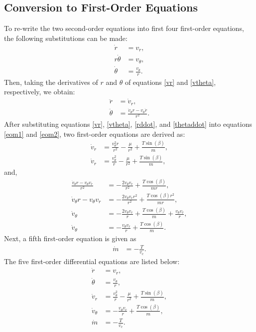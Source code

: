 \documentclass[]{article}
\begin{document}
	\subsection{Conversion to First-Order Equations}
	To re-write the two second-order equations into first four first-order equations, the following substitutions can be made:
	\begin{align}
		\dot{r}       &= v_r,     \label{vr} \\
		r\dot{\theta} &= v_\theta,  \nonumber \\
		\dot{\theta}  &= \frac{v_\theta}{r}. \label{vtheta}
	\end{align}
	Then, taking the derivatives of \(r\) and \(\theta\) of equations \ref{vr} and \ref{vtheta}, respectively, we obtain:
	\begin{align}
		\ddot{r}      &= \dot{v}_r,  \label{rddot} \\
		\ddot{\theta} &= \frac{\dot{v}_{\theta}r - v_{\theta}\dot{r}}{r^2}. \label{thetaddot}
	\end{align}
	After substituting equations \ref{vr}, \ref{vtheta}, \ref{rddot}, and \ref{thetaddot} into equations \ref{eom1} and \ref{eom2}, two first-order equations are derived as:
	\begin{align}
		\dot{v}_r     &= \frac{v^2_{\theta}r}{r^2} - \frac{\mu}{r^2} + \frac{T\sin(\beta)}{m},                      \nonumber \\
		\dot{v}_r     &= \frac{v^2_{\theta}}{r} - \frac{\mu}{r^2} + \frac{T\sin(\beta)}{m},                        \label{vrdot}
	\end{align}
	and,
	\begin{align}
		\frac{\dot{v}_{\theta}r - v_{\theta}v_r}{r^2} &= -\frac{2v_{\theta}v_r}{r^2}   + \frac{T\cos(\beta)}{mr},   \nonumber\\
		\dot{v}_{\theta}r - v_{\theta}v_r &= -\frac{2v_{\theta}v_{r}r^2}{r^2}   + \frac{T\cos(\beta)r^2}{mr},       \nonumber\\
		\dot{v}_\theta &= -\frac{2v_{\theta}v_{r}}{r}   + \frac{T\cos(\beta)}{m} + \frac{v_{\theta}v_r}{r},        \nonumber\\
		\dot{v}_\theta &= -\frac{v_{\theta}v_{r}}{r}   + \frac{T\cos(\beta)}{m} \label{vthetadot}.
	\end{align}
	Next, a fifth first-order equation is given as
	\begin{align}
		\dot{m} &= -\frac{T}{v_e}. \label{massflowrate}
	\end{align}
	The five first-order differential equations are listed below:
	\begin{align*}
		\dot{r}       &= v_r,     \\
		\dot{\theta}  &= \frac{v_\theta}{r},  \\ 
	    \dot{v}_r     &= \frac{v^2_{\theta}}{r} - \frac{\mu}{r^2} + \frac{T\sin(\beta)}{m},       \\
		\dot{v}_\theta &= -\frac{v_{\theta}v_{r}}{r}   + \frac{T\cos(\beta)}{m}, \\
		\dot{m} &= -\frac{T}{v_e}.
	\end{align*}
\end{document}
